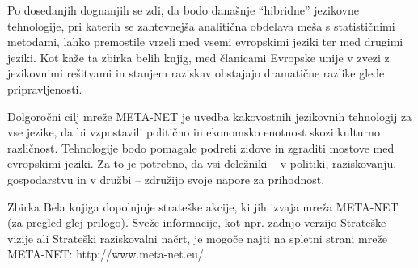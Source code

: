 \begin{multicols}{2}

Po dosedanjih dognanjih se zdi, da bodo današnje “hibridne” jezikovne tehnologije, pri katerih se zahtevnejša analitična obdelava meša s statistič\-nimi metodami, lahko premostile vrzeli med vsemi evropskimi jeziki ter med drugimi jeziki. Kot kaže ta zbirka belih knjig, med članicami Evropske unije v zvezi z jezikovnimi rešitvami in stanjem raziskav obstajajo dramatične razlike glede pripravljenosti. 

Dolgoročni cilj mreže META-NET je uvedba kakovostnih jezikovnih tehnologij za vse jezike, da bi vzpostavili politično in ekonomsko enotnost skozi kulturno različnost. Tehnologije bodo pomagale podreti zidove in zgraditi mostove med evropskimi jeziki. Za to je potrebno, da vsi deležniki – v politiki, raziskovanju, gospodarstvu in v družbi – združijo svoje napore za prihodnost.

Zbirka Bela knjiga dopolnjuje strateške akcije, ki jih izvaja mreža META-NET (za pregled glej pri\-logo). Sveže informacije, kot npr. zadnjo verzijo Strateške vizije \cite{Meta1} ali Strateški raziskovalni načrt, je mogoče najti na spletni strani mreže META-NET: http://www.meta-net.eu/. 
\end{multicols}

\clearpage



